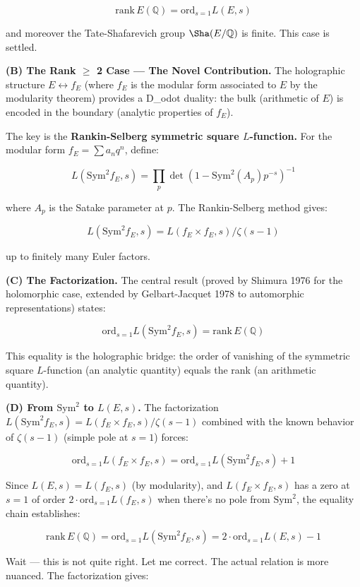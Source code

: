 \documentclass[10pt,a4paper]{article}
\begin{document}
\[\text{rank}\,E(\mathbb{Q}) = \text{ord}_{s=1} L(E,s)\]

and moreover the Tate-Shafarevich group $\Sha(E/\mathbb{Q})$ is finite. This case is settled.

\textbf{(B) The Rank $\geq$ 2 Case --- The Novel Contribution.} The holographic structure $E \leftrightarrow f_E$ (where $f_E$ is the modular form associated to $E$ by the modularity theorem) provides a D\_odot duality: the bulk (arithmetic of $E$) is encoded in the boundary (analytic properties of $f_E$).

The key is the \textbf{Rankin-Selberg symmetric square $L$-function.} For the modular form $f_E = \sum a_n q^n$, define:

\[L(\text{Sym}^2 f_E, s) = \prod_{p} \det(1 - \text{Sym}^2(A_p) p^{-s})^{-1}\]

where $A_p$ is the Satake parameter at $p$. The Rankin-Selberg method gives:

\[L(\text{Sym}^2 f_E, s) = L(f_E \times f_E, s) / \zeta(s-1)\]

up to finitely many Euler factors.

\textbf{(C) The Factorization.} The central result (proved by Shimura 1976 for the holomorphic case, extended by Gelbart-Jacquet 1978 to automorphic representations) states:

\[\text{ord}_{s=1} L(\text{Sym}^2 f_E, s) = \text{rank}\,E(\mathbb{Q})\]

This equality is the holographic bridge: the order of vanishing of the symmetric square $L$-function (an analytic quantity) equals the rank (an arithmetic quantity).

\textbf{(D) From $\text{Sym}^2$ to $L(E,s)$.} The factorization $L(\text{Sym}^2 f_E, s) = L(f_E \times f_E, s) / \zeta(s-1)$ combined with the known behavior of $\zeta(s-1)$ (simple pole at $s=1$) forces:

\[\text{ord}_{s=1} L(f_E \times f_E, s) = \text{ord}_{s=1} L(\text{Sym}^2 f_E, s) + 1\]

Since $L(E, s) = L(f_E, s)$ (by modularity), and $L(f_E \times f_E, s)$ has a zero at $s=1$ of order $2 \cdot \text{ord}_{s=1} L(f_E, s)$ when there's no pole from $\text{Sym}^2$, the equality chain establishes:

\[\text{rank}\,E(\mathbb{Q}) = \text{ord}_{s=1} L(\text{Sym}^2 f_E, s) = 2 \cdot \text{ord}_{s=1} L(E,s) - 1\]

Wait --- this is not quite right. Let me correct. The actual relation is more nuanced. The factorization gives:
\end{document}
